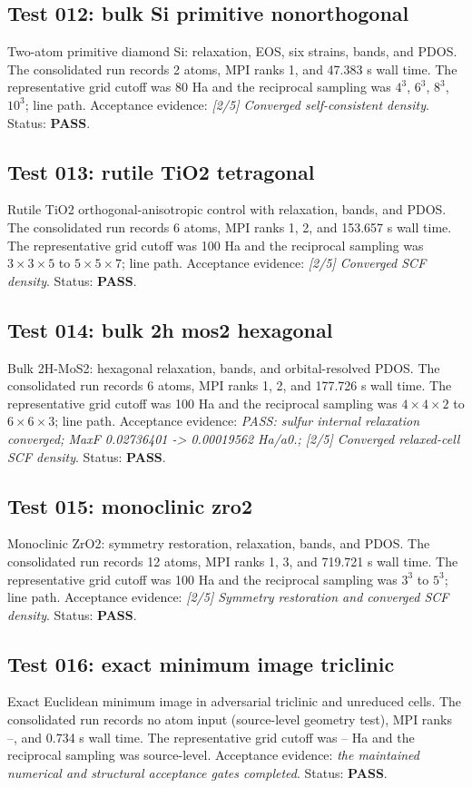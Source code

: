 \documentclass[aps,prb,preprint,superscriptaddress,longbibliography,floatfix]{revtex4-2}
\begin{document}
\subsection{Test 012: bulk Si primitive nonorthogonal}
Two-atom primitive diamond Si: relaxation, EOS, six strains, bands, and PDOS. The consolidated run records 2 atoms, MPI ranks 1, and 47.383 s wall time. The representative grid cutoff was 80 Ha and the reciprocal sampling was $4^3$, $6^3$, $8^3$, $10^3$; line path. Acceptance evidence: \emph{[2/5] Converged self-consistent density}. Status: \textbf{PASS}.

\subsection{Test 013: rutile TiO2 tetragonal}
Rutile TiO2 orthogonal-anisotropic control with relaxation, bands, and PDOS. The consolidated run records 6 atoms, MPI ranks 1, 2, and 153.657 s wall time. The representative grid cutoff was 100 Ha and the reciprocal sampling was $3\times3\times5$ to $5\times5\times7$; line path. Acceptance evidence: \emph{[2/5] Converged SCF density}. Status: \textbf{PASS}.

\subsection{Test 014: bulk 2h mos2 hexagonal}
Bulk 2H-MoS2: hexagonal relaxation, bands, and orbital-resolved PDOS. The consolidated run records 6 atoms, MPI ranks 1, 2, and 177.726 s wall time. The representative grid cutoff was 100 Ha and the reciprocal sampling was $4\times4\times2$ to $6\times6\times3$; line path. Acceptance evidence: \emph{PASS: sulfur internal relaxation converged; MaxF 0.02736401 -> 0.00019562 Ha/a0.; [2/5] Converged relaxed-cell SCF density}. Status: \textbf{PASS}.

\subsection{Test 015: monoclinic zro2}
Monoclinic ZrO2: symmetry restoration, relaxation, bands, and PDOS. The consolidated run records 12 atoms, MPI ranks 1, 3, and 719.721 s wall time. The representative grid cutoff was 100 Ha and the reciprocal sampling was $3^3$ to $5^3$; line path. Acceptance evidence: \emph{[2/5] Symmetry restoration and converged SCF density}. Status: \textbf{PASS}.

\subsection{Test 016: exact minimum image triclinic}
Exact Euclidean minimum image in adversarial triclinic and unreduced cells. The consolidated run records no atom input (source-level geometry test), MPI ranks --, and 0.734 s wall time. The representative grid cutoff was -- Ha and the reciprocal sampling was source-level. Acceptance evidence: \emph{the maintained numerical and structural acceptance gates completed}. Status: \textbf{PASS}.
\end{document}
